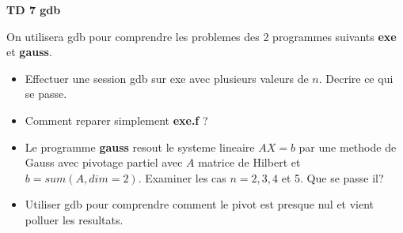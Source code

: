 \documentclass{article}\parskip5pt
\begin{document}
\begin{center}
{\bf TD 7 gdb} \\
\end{center}

On utilisera gdb pour comprendre les problemes des 2 programmes
suivants {\bf exe} et {\bf gauss}.

\begin{itemize}
\item  Effectuer une session gdb sur exe avec plusieurs valeurs de
$n$. Decrire ce qui se passe.
\item Comment reparer simplement {\bf exe.f }?
\item Le programme {\bf gauss} resout le systeme lineaire
$AX=b$ par une methode de Gauss avec pivotage partiel avec
$A$ matrice de Hilbert et $b=sum(A,dim=2)$.
Examiner les cas $n=2,3,4 $ et 5. Que se passe il?
\item Utiliser gdb pour comprendre comment le pivot est presque nul
et vient polluer les resultats.
\end{itemize}
\end{document}
